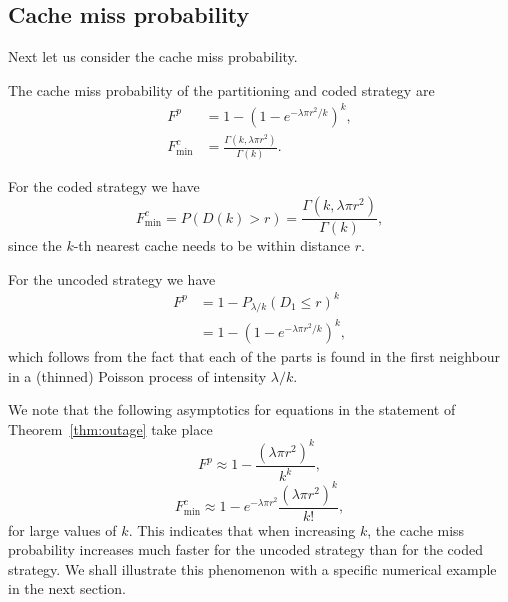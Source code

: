 \subsection{Cache miss probability}
Next let us consider the cache miss probability.
\begin{theorem}\label{thm:outage}
The cache miss probability of the partitioning and coded strategy are
\begin{align}
F^p &= 1 - \left( 1 - e^{-\lambda\pi r^2/k} \right)^k, \\
F^c_\mathrm{min} &= \frac{\Gamma(k,\lambda\pi r^2)}{\Gamma(k)}.
\end{align}
\end{theorem}
\begin{IEEEproof}
For the coded strategy we have
\begin{equation}\label{eq:Fcmin}
F^c_\mathrm{min} = P(D(k)>r) = \frac{\Gamma(k,\lambda\pi r^2)}{\Gamma(k)},
\end{equation}
since the $k$-th nearest cache needs to be within distance $r$.


For the uncoded strategy we have
\begin{align}
F^p
&= 1 - P_{\lambda/k}(D_1\leq r)^k \\
&= 1 - \left( 1 - e^{-\lambda\pi r^2/k} \right)^k, \end{align}
which follows from the fact that each of the parts is found in the first neighbour in a (thinned) Poisson process of intensity $\lambda/k$.
\end{IEEEproof}

We note that the following asymptotics for equations in the statement of Theorem~\ref{thm:outage} take place
$$
F^p \approx 1 - \frac{(\lambda\pi r^2)^k}{k^k},
$$
$$
F^c_\mathrm{min} \approx 1- e^{-\lambda\pi r^2} \frac{(\lambda\pi r^2)^k}{k!},
$$
for large values of $k$. This indicates that when increasing $k$, the cache miss probability increases much faster for the uncoded
strategy than for the coded strategy. We shall illustrate this phenomenon with a specific numerical example in the next section.
